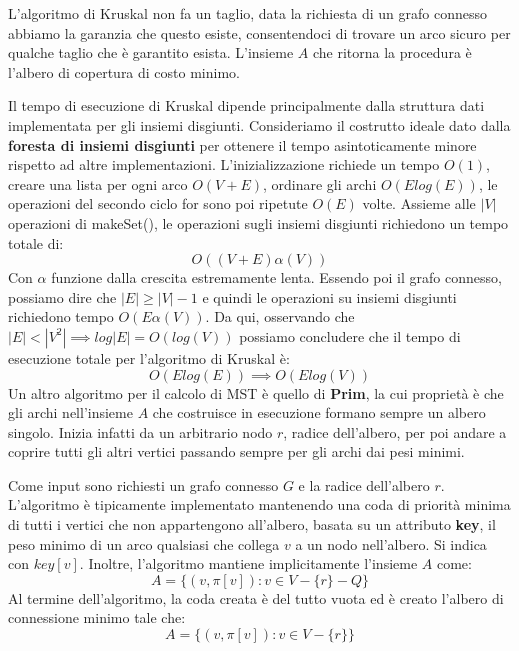 \noindent L'algoritmo di Kruskal non fa un taglio, data la richiesta di un grafo connesso abbiamo la garanzia che questo esiste, consentendoci di trovare un arco sicuro per qualche taglio che è garantito esista. L'insieme $A$ che ritorna la procedura è l'albero di copertura di costo minimo.\par
Il tempo di esecuzione di Kruskal dipende principalmente dalla struttura dati implementata per gli insiemi disgiunti. Consideriamo il costrutto ideale dato dalla \textbf{foresta di insiemi disgiunti} per ottenere il tempo asintoticamente minore rispetto ad altre implementazioni. L'inizializzazione richiede un tempo $O(1)$, creare una lista per ogni arco $O(V+E)$, ordinare gli archi $O(Elog(E))$, le operazioni del secondo ciclo for sono poi ripetute $O(E)$ volte. Assieme alle $|V|$ operazioni di makeSet(), le operazioni sugli insiemi disgiunti richiedono un tempo totale di: \[O((V+E)\alpha(V))\]
\noindent Con $\alpha$ funzione dalla crescita estremamente lenta. Essendo poi il grafo connesso, possiamo dire che $|E|\geq |V|-1$ e quindi le operazioni su insiemi disgiunti richiedono tempo $O(E\alpha(V))$. Da qui, osservando che $|E| < |V^2| \implies log|E| = O(log(V))$ possiamo concludere che il tempo di esecuzione totale per l'algoritmo di Kruskal è: \[O(Elog(E))\implies O(Elog(V))\]
\noindent Un altro algoritmo per il calcolo di MST è quello di \textbf{Prim}, la cui proprietà è che gli archi nell'insieme $A$ che costruisce in esecuzione formano sempre un albero singolo. Inizia infatti da un arbitrario nodo $r$, radice dell'albero, per poi andare a coprire tutti gli altri vertici passando sempre per gli archi dai pesi minimi.\par
Come input sono richiesti un grafo connesso $G$ e la radice dell'albero $r$. L'algoritmo è tipicamente implementato mantenendo una coda di priorità minima di tutti i vertici che non appartengono all'albero, basata su un attributo \textbf{key}, il peso minimo di un arco qualsiasi che collega $v$ a un nodo nell'albero. Si indica con $key[v]$. Inoltre, l'algoritmo mantiene implicitamente l'insieme $A$ come: \[A = \{(v, \pi[v]):v\in V - \{r\} - Q\}\]
\noindent Al termine dell'algoritmo, la coda creata è del tutto vuota ed è creato l'albero di connessione minimo tale che: \[A = \{(v,\pi[v]):v\in V-\{r\}\}\]
